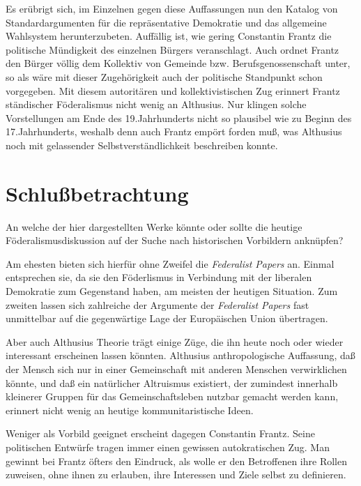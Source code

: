 \documentclass[a4paper,12pt]{article}
\begin{document}
Es erübrigt sich, im Einzelnen gegen diese Auffassungen nun den
Katalog von Standardargumenten für die repräsentative Demokratie
und das allgemeine Wahlsystem herunterzubeten. Auffällig ist, wie
gering Constantin Frantz die politische Mündigkeit des einzelnen
Bürgers veranschlagt. Auch ordnet Frantz den Bürger völlig dem
Kollektiv von Gemeinde bzw. Berufsgenossenschaft unter, so als wäre
mit dieser Zugehörigkeit auch der politische Standpunkt schon
vorgegeben. Mit diesem autoritären und kollektivistischen Zug
erinnert Frantz ständischer Föderalismus nicht wenig an
Althusius. Nur klingen solche Vorstellungen am Ende des 19.Jahrhunderts
nicht so plausibel wie zu Beginn des 17.Jahrhunderts, weshalb denn
auch Frantz empört forden muß, was Althusius noch mit gelassender
Selbstverständlichkeit beschreiben konnte.


\section{Schlußbetrachtung}

An welche der hier dargestellten Werke könnte oder sollte die
heutige Föderalismusdiskussion auf der Suche nach historischen
Vorbildern anknüpfen? 

Am ehesten bieten sich hierfür ohne Zweifel die {\em Federalist
Papers} an. Einmal entsprechen sie, da sie den Föderlismus in
Verbindung mit der liberalen Demokratie zum Gegenstand haben, am
meisten der heutigen Situation. Zum zweiten lassen sich zahlreiche
der Argumente der {\em Federalist Papers} fast unmittelbar auf die
gegenwärtige Lage der Europäischen Union übertragen.

Aber auch Althusius Theorie trägt einige Züge, die ihn heute noch
oder wieder interessant erscheinen lassen könnten. Althusius
anthropologische Auffassung, daß der Mensch sich nur in einer
Gemeinschaft mit anderen Menschen verwirklichen könnte, und daß ein
natürlicher Altruismus existiert, der zumindest innerhalb kleinerer
Gruppen für das Gemeinschaftsleben nutzbar gemacht werden kann,
erinnert nicht wenig an heutige kommunitaristische Ideen.

Weniger als Vorbild geeignet erscheint dagegen Constantin
Frantz. Seine politischen Entwürfe tragen immer einen gewissen
autokratischen Zug. Man gewinnt bei Frantz öfters den Eindruck, als
wolle er den Betroffenen ihre Rollen zuweisen, ohne ihnen zu
erlauben, ihre Interessen und Ziele selbst zu definieren.

\newpage
\end{document}

